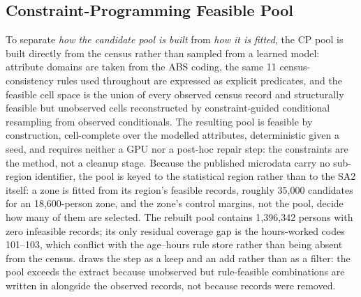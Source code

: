 \documentclass[review]{elsarticle}
\begin{document}
\subsection{Constraint-Programming Feasible Pool}
\label{sec:cp}
To separate \emph{how the candidate pool is built} from \emph{how it is fitted}, the CP pool is built directly from the census rather than sampled from a learned model: attribute domains are taken from the ABS coding, the same 11 census-consistency rules used throughout are expressed as explicit predicates, and the feasible cell space is the union of every observed census record and structurally feasible but unobserved cells reconstructed by constraint-guided conditional resampling from observed conditionals. The resulting pool is feasible by construction, cell-complete over the modelled attributes, deterministic given a seed, and requires neither a GPU nor a post-hoc repair step: the constraints are the method, not a cleanup stage. Because the published microdata carry no sub-region identifier, the pool is keyed to the statistical region rather than to the SA2 itself: a zone is fitted from its region's feasible records, roughly 35{,}000 candidates for an 18{,}600-person zone, and the zone's control margins, not the pool, decide how many of them are selected. The rebuilt pool contains 1{,}396{,}342 persons with zero infeasible records; its only residual coverage gap is the hours-worked codes 101--103, which conflict with the age--hours rule store rather than being absent from the census.  draws the step as a keep and an add rather than as a filter: the pool exceeds the extract because unobserved but rule-feasible combinations are written in alongside the observed records, not because records were removed.
\end{document}
